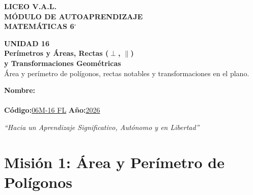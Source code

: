 \documentclass[12pt, letterpaper]{article}
\begin{document}
	
	\begin{center}
		{\Huge\textbf{LICEO V.A.L.}}\\[0.5cm]
		{\LARGE\textbf{MÓDULO DE AUTOAPRENDIZAJE}}\\[0.5cm]
		{\Large\textbf{MATEMÁTICAS 6$^\circ$}}\\[0.5cm]
		\begin{tcolorbox}[colback=valblue!10, colframe=valblue,
			arc=3mm, boxrule=1.5pt]
			\centering
			\Huge\textbf{UNIDAD 16}\\[0.25cm]
			\Large\textbf{Perímetros y Áreas, Rectas ($\perp$, $\parallel$)}\\[0.1cm]
			\Large\textbf{y Transformaciones Geométricas}\\[0.2cm]
			\large Área y perímetro de polígonos, rectas notables y transformaciones en el plano.
		\end{tcolorbox}
		\vspace{0.6cm}
		\begin{tcolorbox}[colback=white, colframe=valblue,
			width=12cm, arc=3mm, boxrule=1.5pt]
			\centering\vspace{0.3cm}
			\textbf{Nombre:}\\[0.3cm]
			\underline{\hspace{9cm}}\\[0.5cm]
			\textbf{Código:}\;\underline{06M-16 FL}
			\hspace{1cm}\textbf{Año:}\;\underline{2026}
			\vspace{0.3cm}
		\end{tcolorbox}
		\vspace{0.8cm}
		\textit{``Hacia un Aprendizaje Significativo, Autónomo y en Libertad''}
	\end{center}
	
	\section*{Misión 1: Área y Perímetro de Polígonos}
	
\end{document}
